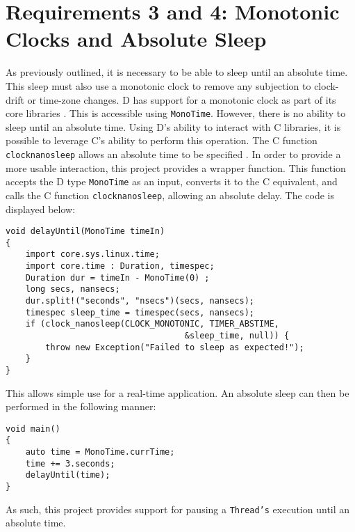 \section{Requirements 3 and 4: Monotonic Clocks and Absolute Sleep}
As previously outlined, it is necessary to be able to sleep until 
an absolute time. This sleep must also use a monotonic clock 
to remove any subjection to clock-drift or time-zone changes. D has support 
for a monotonic clock as part of its core libraries 
\cite{dlang-core-time}. This is accessible using 
\texttt{MonoTime}. However, there is no ability to sleep until an 
absolute time. Using D's ability to interact with C libraries, it is possible 
to leverage C's ability to perform this operation. The C function 
\texttt{clock\textunderscore{}nanosleep} allows an absolute time to be specified
\cite{clock-nanosleep}.
In order to provide a more usable interaction, this project provides a wrapper
function. 
This function accepts the D type \texttt{MonoTime} as an input, converts it to the C 
equivalent, and calls the C function \texttt{clock\textunderscore{}nanosleep}, 
allowing an absolute delay. The code is displayed below: 
\begin{lstlisting}[basicstyle=\small]
void delayUntil(MonoTime timeIn)
{
    import core.sys.linux.time; 
    import core.time : Duration, timespec; 
    Duration dur = timeIn - MonoTime(0) ;
    long secs, nansecs; 
    dur.split!("seconds", "nsecs")(secs, nansecs); 
    timespec sleep_time = timespec(secs, nansecs); 
    if (clock_nanosleep(CLOCK_MONOTONIC, TIMER_ABSTIME, 
                                    &sleep_time, null)) {
        throw new Exception("Failed to sleep as expected!"); 
    }
}
\end{lstlisting}
This allows simple use for a real-time application. An absolute sleep can 
then be performed in the following manner: 
\begin{lstlisting}[basicstyle=\small]
void main()
{
    auto time = MonoTime.currTime; 
    time += 3.seconds; 
    delayUntil(time);
}
\end{lstlisting}
As such, this project provides support for pausing a \texttt{Thread's}
execution until an absolute time. 

